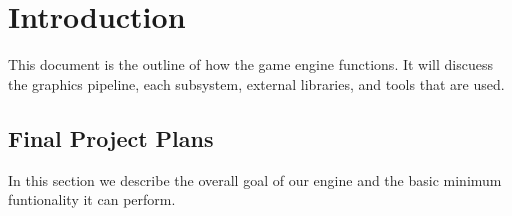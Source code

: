 \section{Introduction}

This document is the outline of how the game engine functions.  It will discuess the graphics pipeline, each subsystem, external libraries, and tools that are used.

\subsection{Final Project Plans}

In this section we describe the overall goal of our engine and the basic minimum funtionality it can perform.
